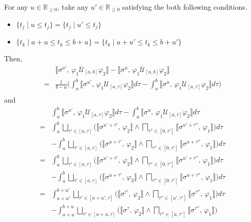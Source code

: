 \documentclass[envcountsect,orivec]{llncs} \usepackage{etex} \usepackage[]{graphicx}
\newcommand{\R}{{\mathbb{R}}}
\newcommand{\UntilOp}[1]{\mathbin{\mathcal{U}_{#1}}}
\newcommand{\TUntil}[1]{\mathbin{\overline{\mathcal{U}}_{#1}}}
\newcommand{\Robust}[2]{{ \llbracket #1,\, #2 \rrbracket}}
\newcommand{\Vee}[1]{{{\bigsqcup_{#1}}}}
\newcommand{\Wedge}[1]{{{\bigsqcap_{#1}}}}
\newcommand{\Frac}[2]{{\displaystyle{\frac{#1}{#2}}}}
\newcommand{\Int}{\displaystyle \int}
\newcommand{\Rnn}{\R_{\ge 0}}
\begin{document}
{\begin{myproof}
  For any 
  $u \in \Rnn$,
  take any $u' \in \Rnn$ satisfying the both following conditions.
  \begin{itemize}
    \item $\{t_j \mid u \leq t_j \} = \{t_j \mid u' \leq t_j \}$
    \item $\{t_k \mid a+u \leq t_k \leq b+u \} = \{t_k \mid a+u'\leq t_k \leq b+u' \}$
  \end{itemize}
  Then,
  \[
    \begin{array}{ll}
      &\Robust{\sigma^{u'}}{\varphi_1 \TUntil{[a,b]} \varphi_2} 
      - \Robust{\sigma^u}{\varphi_1 \TUntil{[a,b]} \varphi_2}\\
      =&\Frac{1}{b-a} 
      \bigg( \Int_a^b \Robust{\sigma^{u'}}{\varphi_1 \UntilOp{[a,\tau]} \varphi_2} d\tau 
      - \Int_a^b \Robust{\sigma^{u}}{\varphi_1 \UntilOp{[a,\tau]} \varphi_2} d\tau \bigg)\\
    \end{array}
  \]
  and
  \begin{align*}
      & \Int_a^b \Robust{\sigma^{u'}}{\varphi_1 \UntilOp{[a,\tau]} \varphi_2} d\tau
      - \Int_a^b \Robust{\sigma^{u}}{\varphi_1 \UntilOp{[a,\tau]} \varphi_2} d\tau\\
      = &
      \Int_a^b 
      \Vee{\tau' \in [a, \tau] }
      \Big( \Robust{\sigma^{u'+\tau'}}{\varphi_2} \wedge \Wedge{\tau'' \in [0, \tau']} \Robust{\sigma^{u'+\tau''}}{\varphi_1} \Big) 
      d\tau \\
      &- \Int_a^b 
      \Vee{\tau' \in [a, \tau] }
      \Big( \Robust{\sigma^{u+\tau'}}{\varphi_2} \wedge \Wedge{\tau'' \in [0, \tau']} \Robust{\sigma^{u+\tau''}}{\varphi_1} \Big) 
      d\tau\\
      =&
      \Int_a^b 
      \Vee{\tau' \in [a, \tau] }
      \Big( \Robust{\sigma^{u'+\tau'}}{\varphi_2} \wedge \Wedge{\tau'' \in [0, \tau']} \Robust{\sigma^{u'+\tau''}}{\varphi_1} \Big) 
      d\tau \\
      &- \Int_a^b 
      \Vee{\tau' \in [a, \tau] }
      \Big( \Robust{\sigma^{u+\tau'}}{\varphi_2} \wedge \Wedge{\tau'' \in [0, \tau']} \Robust{\sigma^{u+\tau''}}{\varphi_1} \Big) 
      d\tau\\
      =&
      \Int_{a+u'}^{b+u'} 
      \Vee{\tau' \in [a+u', \tau] }
      \Big( \Robust{\sigma^{\tau'}}{\varphi_2} \wedge \Wedge{\tau'' \in [u', \tau']} \Robust{\sigma^{\tau''}}{\varphi_1} \Big) 
      d\tau \\
      &- \Int_{a+u}^{b+u} 
      \Vee{\tau' \in [a+u, \tau] }
      \Big( \Robust{\sigma^{\tau}}{\varphi_2} \wedge \Wedge{\tau'' \in [u, \tau']} \Robust{\sigma^{\tau''}}{\varphi_1} \Big) 

\end{align*}
\end{myproof}}
\end{document}
